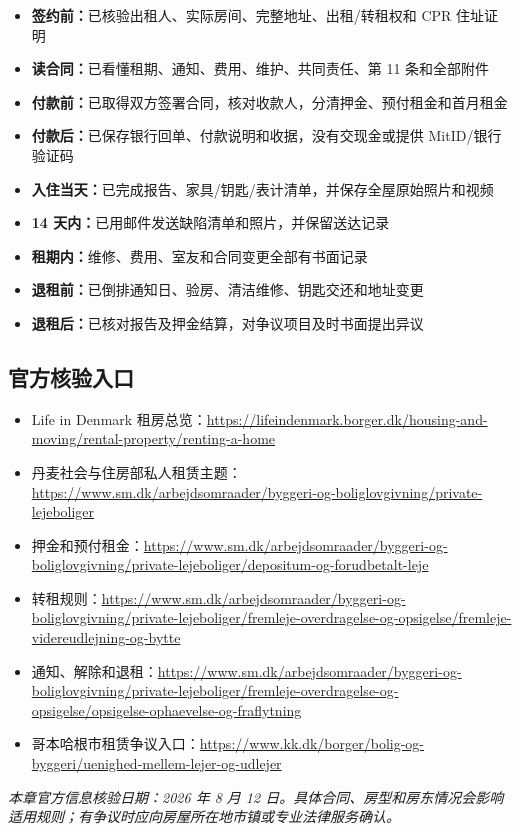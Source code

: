\begin{itemize}[label=$\bigcirc$,leftmargin=2.2em,itemsep=3pt]
  \item \textbf{签约前：}已核验出租人、实际房间、完整地址、出租/转租权和 CPR 住址证明
  \item \textbf{读合同：}已看懂租期、通知、费用、维护、共同责任、第 11 条和全部附件
  \item \textbf{付款前：}已取得双方签署合同，核对收款人，分清押金、预付租金和首月租金
  \item \textbf{付款后：}已保存银行回单、付款说明和收据，没有交现金或提供 MitID/银行验证码
  \item \textbf{入住当天：}已完成报告、家具/钥匙/表计清单，并保存全屋原始照片和视频
  \item \textbf{14 天内：}已用邮件发送缺陷清单和照片，并保留送达记录
  \item \textbf{租期内：}维修、费用、室友和合同变更全部有书面记录
  \item \textbf{退租前：}已倒排通知日、验房、清洁维修、钥匙交还和地址变更
  \item \textbf{退租后：}已核对报告及押金结算，对争议项目及时书面提出异议
\end{itemize}

\subsection{官方核验入口}

\begin{itemize}[leftmargin=2em,itemsep=2pt]
  \item Life in Denmark 租房总览：\url{https://lifeindenmark.borger.dk/housing-and-moving/rental-property/renting-a-home}
  \item 丹麦社会与住房部私人租赁主题：\url{https://www.sm.dk/arbejdsomraader/byggeri-og-boliglovgivning/private-lejeboliger}
  \item 押金和预付租金：\url{https://www.sm.dk/arbejdsomraader/byggeri-og-boliglovgivning/private-lejeboliger/depositum-og-forudbetalt-leje}
  \item 转租规则：\url{https://www.sm.dk/arbejdsomraader/byggeri-og-boliglovgivning/private-lejeboliger/fremleje-overdragelse-og-opsigelse/fremleje-videreudlejning-og-bytte}
  \item 通知、解除和退租：\url{https://www.sm.dk/arbejdsomraader/byggeri-og-boliglovgivning/private-lejeboliger/fremleje-overdragelse-og-opsigelse/opsigelse-ophaevelse-og-fraflytning}
  \item 哥本哈根市租赁争议入口：\url{https://www.kk.dk/borger/bolig-og-byggeri/uenighed-mellem-lejer-og-udlejer}
\end{itemize}

\noindent\textit{本章官方信息核验日期：2026 年 8 月 12 日。具体合同、房型和房东情况会影响适用规则；有争议时应向房屋所在地市镇或专业法律服务确认。}
